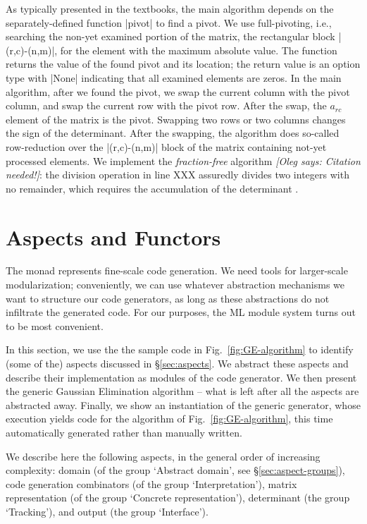 \documentclass{elsart}
\newcommand{\oleg}[1]{{\it [Oleg says: #1]}}
\begin{document}
As typically presented in the textbooks, the main algorithm depends on
the separately-defined function |pivot| to find a pivot. We use
full-pivoting, i.e., searching the non-yet examined portion of the matrix, 
the rectangular block |(r,c)-(n,m)|, for the element with the 
maximum absolute value. The function returns the value of the
found pivot and its location; the return value is an option type with
|None| indicating that all examined elements are zeros. In the main
algorithm, after we found the pivot, we swap the current column 
with the pivot column, and swap the current row with the pivot row. 
After the swap, the $a_{rc}$ element of the matrix is the pivot.
Swapping two rows or two columns changes the sign of the determinant.
After the swapping, the algorithm does so-called row-reduction
over the |(r,c)-(n,m)| block of the matrix containing not-yet
processed elements. We implement the \emph{fraction-free}
algorithm \oleg{Citation needed!}:
the division operation in line XXX assuredly divides two integers
with no remainder, which requires the accumulation
of the determinant .

\section{Aspects and Functors}\label{functors}

The monad represents fine-scale code generation. We need tools for
larger-scale modularization; conveniently, we can use whatever abstraction
mechanisms we want to structure our code generators, as long as these
abstractions do not infiltrate the generated code. For our purposes, the
ML module system turns out to be most convenient.

In this section, we use the the sample code in
Fig.~\ref{fig:GE-algorithm} to identify (some of the) aspects
discussed in \S\ref{sec:aspects}. We abstract these aspects and
describe their implementation as modules of the code generator.  We
then present the generic Gaussian Elimination algorithm -- what is
left after all the aspects are abstracted away. Finally, we show an
instantiation of the generic generator, whose execution yields code
for the algorithm of Fig.~\ref{fig:GE-algorithm}, this time
automatically generated rather than manually written.

We describe here the following aspects, in the general
order of increasing complexity: domain (of the group `Abstract
domain', see \S\ref{sec:aspect-groups}), code generation combinators
(of the group `Interpretation'), matrix representation (of the group
`Concrete representation'), determinant (the group `Tracking'), and
output (the group `Interface').
\end{document}
